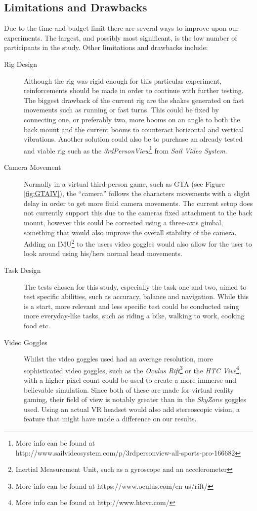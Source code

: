 \documentclass[runningheads,a4paper,oribibl]{llncs}
\begin{document}
\subsection{Limitations and Drawbacks}
Due to the time and budget limit there are several ways to improve upon our experiments. The largest, and possibly most significant, is the low number of participants in the study. Other limitations and drawbacks include:
\begin{description}
	\item[Rig Design] Although the rig was rigid enough for this particular experiment, reinforcements should be made in order to continue with further testing. The biggest drawback of the current rig are the shakes generated on fast movements such as running or fast turns. This could be fixed by connecting one, or preferably two, more booms on an angle to both the back mount and the current booms to counteract horizontal and vertical vibrations. Another solution could also be to purchase an already tested and viable rig such as the \emph{3rdPersonView}\footnote{More info can be found at http://www.sailvideosystem.com/p/3rdpersonview-all-sports-pro-166682} from \emph{Sail Video System}.

	\item[Camera Movement] Normally in a virtual third-person game, such as GTA (see Figure \ref{fig:GTAIV}), the ``camera'' follows the characters movements with a slight delay in order to get more fluid camera movements. The current setup does not currently support this due to the cameras fixed attachment to the back mount, however this could be corrected using a three-axis gimbal, something that would also improve the overall stability of the camera. Adding an IMU\footnote{Inertial Measurement Unit, such as a gyroscope and an accelerometer} to the users video goggles would also allow for the user to look around using his/hers normal head movements.

	\item[Task Design] The tests chosen for this study, especially the task one and two, aimed to test specific abilities, such as accuracy, balance and navigation. While this is a start, more relevant and less specific test could be conducted using more everyday-like tasks, such as riding a bike, walking to work, cooking food etc.

	\item[Video Goggles] Whilst the video goggles used had an average resolution, more sophisticated video goggles, such as the \emph{Oculus Rift}\footnote{More info can be found at https://www.oculus.com/en-us/rift/} or the \emph{HTC Vive}\footnote{More info can be found at http://www.htcvr.com/}, with a higher pixel count could be used to create a more immerse and believable simulation. Since both of these are made for virtual reality gaming, their field of view is notably greater than in the \emph{SkyZone} goggles used. Using an actual VR headset would also add stereoscopic vision, a feature that might have made a difference on our results.


\end{description}
\end{document}
